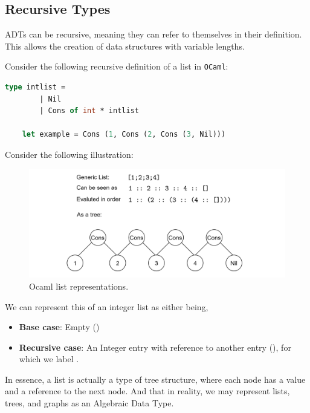 \subsection{Recursive Types}
\noindent
ADTs can be recursive, meaning they can refer to themselves in their definition. This allows the creation of data structures with variable lengths.
\begin{theo}

    Consider the following recursive definition of a list in \texttt{OCaml}:
    
    \begin{lstlisting}[language=OCaml, caption={Recursive List Definition}, numbers=none]
    type intlist =
        | Nil
        | Cons of int * intlist

    let example = Cons (1, Cons (2, Cons (3, Nil)))
    \end{lstlisting}
\end{theo}

\noindent
Consider the following illustration:
\begin{figure}[h]
    \hspace{-1em}
    \includegraphics[width=1.1\textwidth]{Sections/adt/cons.png}
    \caption{Ocaml list representations.}
\end{figure}

\noindent
We can represent this of an integer list as either being,
\begin{itemize}
    \item \textbf{Base case}: Empty ()
    \item \textbf{Recursive case}: An Integer entry with reference to another entry (), for which we label .
\end{itemize}

\noindent
In essence, a list is actually a type of tree structure, where each node has a value and a reference to the next node. And that in reality, we may 
represent lists, trees, and graphs as an Algebraic Data Type.

